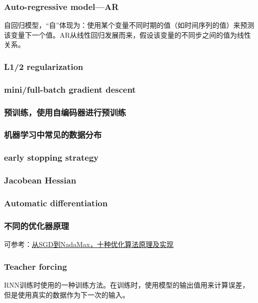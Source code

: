 \subsubsection{Auto-regressive model---AR}
自回归模型，“自”体现为：使用某个变量不同时期的值（如时间序列的值）来预测该变量下一个值。AR从线性回归发展而来，假设该变量的不同步之间的值为线性关系。


\subsubsection{L1/2 regularization}

\subsubsection{mini/full-batch gradient descent}


\subsubsection{预训练，使用自编码器进行预训练}

\subsubsection{机器学习中常见的数据分布}

\subsubsection{early stopping strategy}

\subsubsection{Jacobean Hessian}


\subsubsection{Automatic differentiation} 

\subsubsection{不同的优化器原理}
可参考：\href{https://mp.weixin.qq.com/s/L9jCK5rtyq3fJZEBpLvagg}{从SGD到NadaMax，十种优化算法原理及实现}


\subsubsection{Teacher forcing}     
RNN训练时使用的一种训练方法。在训练时，使用模型的输出值用来计算误差，但是使用真实的数据作为下一次的输入。

